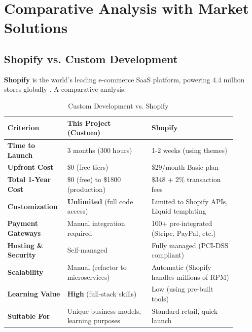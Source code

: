 \documentclass[12pt, a4paper]{report}
\begin{document}
\section{Comparative Analysis with Market Solutions}

\subsection{Shopify vs. Custom Development}

\textbf{Shopify} is the world's leading e-commerce SaaS platform, powering 4.4 million stores globally \cite{shopify2024}. A comparative analysis:

\begin{table}[H]
\centering
\caption{Custom Development vs. Shopify}
\label{tab:shopify_comparison}
\small
\begin{tabular}{@{}p{0.22\linewidth}p{0.35\linewidth}p{0.35\linewidth}@{}}
\toprule
\textbf{Criterion} & \textbf{This Project (Custom)} & \textbf{Shopify} \\
\midrule
\textbf{Time to Launch} & 3 months (300 hours) & 1-2 weeks (using themes) \\
\textbf{Upfront Cost} & \$0 (free tiers) & \$29/month Basic plan \\
\textbf{Total 1-Year Cost} & \$0 (free) to \$1800 (production) & \$348 + 2\% transaction fees \\
\textbf{Customization} & \textbf{Unlimited} (full code access) & Limited to Shopify APIs, Liquid templating \\
\textbf{Payment Gateways} & Manual integration required & 100+ pre-integrated (Stripe, PayPal, etc.) \\
\textbf{Hosting \& Security} & Self-managed & Fully managed (PCI-DSS compliant) \\
\textbf{Scalability} & Manual (refactor to microservices) & Automatic (Shopify handles millions of RPM) \\
\textbf{Learning Value} & \textbf{High} (full-stack skills) & Low (using pre-built tools) \\
\textbf{Suitable For} & Unique business models, learning purposes & Standard retail, quick launch \\
\bottomrule
\end{tabular}
\end{table}
\end{document}
